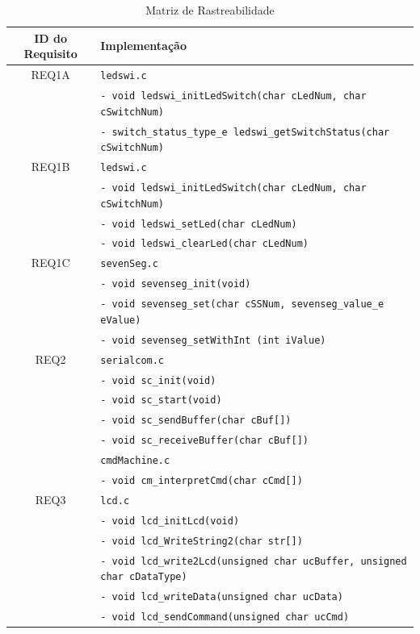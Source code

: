 \documentclass{article}
\begin{document}
\begin{table}[H]
	\centering
	\caption{Matriz de Rastreabilidade}
	\label{tab:rastreabilidade}
	\small
	\begin{tabular}{|c|l|}
		\hline \bfseries{ID do Requisito} & \bfseries{Implementação}\\ 
		\hline REQ1A 	& \texttt{ledswi.c}\\ 
						& \texttt{- void ledswi\_initLedSwitch(char cLedNum, char cSwitchNum)}\\
						& \texttt{- switch\_status\_type\_e ledswi\_getSwitchStatus(char cSwitchNum)}\\
		\hline REQ1B 	& \texttt{ledswi.c}\\ 
						& \texttt{- void ledswi\_initLedSwitch(char cLedNum, char cSwitchNum)}\\
						& \texttt{- void ledswi\_setLed(char cLedNum)}\\ 
						& \texttt{- void ledswi\_clearLed(char cLedNum)}\\
		\hline REQ1C 	& \texttt{sevenSeg.c}\\ 
						& \texttt{- void sevenseg\_init(void)}\\
						& \texttt{- void sevenseg\_set(char cSSNum, sevenseg\_value\_e eValue)}\\
						& \texttt{- void sevenseg\_setWithInt (int iValue)}\\
		\hline REQ2	 	& \texttt{serialcom.c}\\ 
						& \texttt{- void sc\_init(void)}\\
						& \texttt{- void sc\_start(void)}\\
						& \texttt{- void sc\_sendBuffer(char cBuf[])}\\
						& \texttt{- void sc\_receiveBuffer(char cBuf[])}\\
						& \texttt{cmdMachine.c}\\ 
						& \texttt{- void cm\_interpretCmd(char cCmd[])}\\
		\hline REQ3	 	& \texttt{lcd.c}\\ 
						& \texttt{- void lcd\_initLcd(void)}\\
						& \texttt{- void lcd\_WriteString2(char str[])}\\
						& \texttt{- void lcd\_write2Lcd(unsigned char ucBuffer,  unsigned char cDataType)}\\
						& \texttt{- void lcd\_writeData(unsigned char ucData)}\\
						& \texttt{- void lcd\_sendCommand(unsigned char ucCmd)}\\

\end{tabular}
\end{table}
\end{document}
